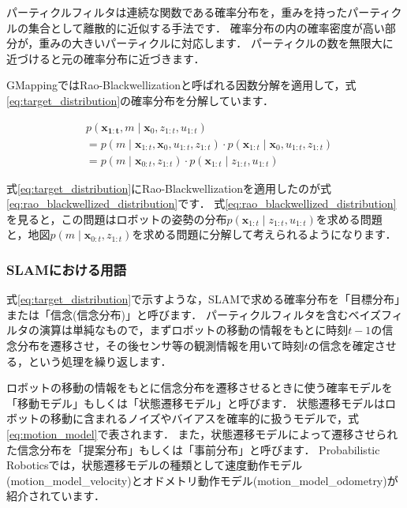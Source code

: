 \documentclass[{../../master}]{subfiles}
\begin{document}
パーティクルフィルタは連続な関数である確率分布を，重みを持ったパーティクルの集合として離散的に近似する手法です．
確率分布の内の確率密度が高い部分が，重みの大きいパーティクルに対応します．
パーティクルの数を無限大に近づけると元の確率分布に近づきます．


GMappingではRao-Blackwellizationと呼ばれる因数分解を適用して，式\ref{eq:target_distribution}の確率分布を分解しています．

\begin{equation}
  \begin{split}
    &p(\bm{x_{1:t}}, m \mid \bm{x}_{0}, z_{1:t}, u_{1:t}) \\
    &= p(m \mid \bm{x}_{1:t}, \bm{x}_{0}, u_{1:t}, z_{1:t}) \cdot p(\bm{x}_{1:t} \mid \bm{x}_{0}, u_{1:t}, z_{1:t}) \\
    &= p(m \mid \bm{x}_{0:t}, z_{1:t}) \cdot p(\bm{x}_{1:t} \mid z_{1:t}, u_{1:t})
  \end{split}
  \label{eq:rao_blackwellized_distribution}
\end{equation}

式\ref{eq:target_distribution}にRao-Blackwellizationを適用したのが式\ref{eq:rao_blackwellized_distribution}です．
式\ref{eq:rao_blackwellized_distribution}を見ると，この問題はロボットの姿勢の分布$p(\bm{x}_{1:t} \mid z_{1:t}, u_{1:t})$を求める問題と，地図$p(m \mid \bm{x}_{0:t}, z_{1:t})$を求める問題に分解して考えられるようになります．

\subsubsection{SLAMにおける用語}

式\ref{eq:target_distribution}で示すような，SLAMで求める確率分布を「目標分布」または「信念(信念分布)」と呼びます．\cite{上田2019}
パーティクルフィルタを含むベイズフィルタの演算は単純なもので，まずロボットの移動の情報をもとに時刻$t-1$の信念分布を遷移させ，その後センサ等の観測情報を用いて時刻$t$の信念を確定させる，という処理を繰り返します．

ロボットの移動の情報をもとに信念分布を遷移させるときに使う確率モデルを「移動モデル」\cite{thrun2005probabilistic}もしくは「状態遷移モデル」\cite{上田2019}と呼びます．
状態遷移モデルはロボットの移動に含まれるノイズやバイアスを確率的に扱うモデルで，式\ref{eq:motion_model}で表されます．
また，状態遷移モデルによって遷移させられた信念分布を「提案分布」もしくは「事前分布」と呼びます．
Probabilistic Roboticsでは，状態遷移モデルの種類として速度動作モデル(\textsf{motion\_model\_velocity})とオドメトリ動作モデル(\textsf{motion\_model\_odometry})が紹介されています．
\end{document}
